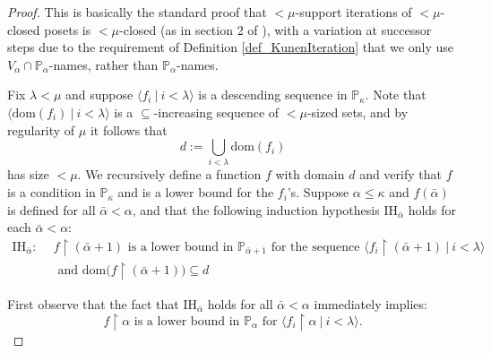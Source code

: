 \documentclass{amsart}
\begin{document}
\begin{proof}
This is basically the standard proof that $<\mu$-support iterations of $<\mu$-closed posets is $<\mu$-closed (as in section 2 of \cite{MR823775}), with a variation at successor steps due to the requirement of Definition \ref{def_KunenIteration} that we only use $V_\alpha \cap \mathbb{P}_\alpha$-names, rather than $\mathbb{P}_\alpha$-names. 

Fix $\lambda < \mu$ and suppose $\langle f_i \ | \ i < \lambda \rangle$ is a descending sequence in $\mathbb{P}_\kappa$.  Note that $\langle \text{dom}(f_i) \ | \ i < \lambda \rangle$ is a $\subseteq$-increasing sequence of $<\mu$-sized sets, and by regularity of $\mu$ it follows that
\[
d:= \bigcup_{i < \lambda} \text{dom}(f_i)
\]
has size $<\mu$.  We recursively define a function $f$ with domain $d$ and verify that $f$ is a condition in $\mathbb{P}_\kappa$ and is a lower bound for the $f_i$'s.  Suppose $\alpha \le \kappa$ and $f (  \bar{\alpha})$ is defined for all $\bar{\alpha} < \alpha$, and that the following induction hypothesis $\text{IH}_{\bar{\alpha}}$ holds for each $\bar{\alpha} < \alpha$:
\begin{align*}
\text{IH}_{\bar{\alpha}}: \ \  &  f \restriction (\bar{\alpha}+1) \text{ is a lower bound in } \mathbb{P}_{\bar{\alpha}+1} \text{ for the sequence }\langle f_i \restriction (\bar{\alpha}+1) \ | \ i < \lambda \rangle \\
& \text{ and } \text{dom}\big(f \restriction (\bar{\alpha}+1) \big) \subseteq d
\end{align*} 

First observe that the fact that $\text{IH}_{\bar{\alpha}}$ holds for all $\bar{\alpha} < \alpha$ immediately implies:
\begin{equation}\label{eq_f_cut_alpha}
f \restriction \alpha \text{ is a lower bound in } \mathbb{P}_\alpha \text{ for } \langle f_i \restriction \alpha \ | \ i < \lambda \rangle.
\end{equation}


\end{proof}
\end{document}
